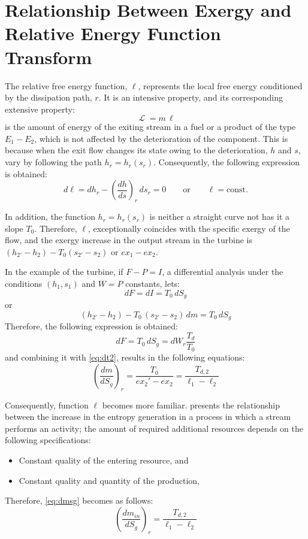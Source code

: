 \documentclass[energies,article,submit,moreauthors,pdftex]{Definitions/mdpi}
\DeclareMathOperator{\Lgdr}{\mathcal{L}}
\begin{document}
\section{Relationship Between Exergy and Relative Energy Function Transform} 
The relative free energy function, $\ell$, represents the local free energy conditioned by the dissipation path, $r$. It is an intensive property, and its corresponding extensive property: 
\begin{equation}
\Lgdr = m\,\ell
\end{equation}                                                
is the amount of energy of the exiting stream in a fuel or a product of the type $E_1-E_2$, which is not affected by the deterioration of the component. This is because when the exit flow changes its state owing to the deterioration, $h$ and $s$, vary by following the path $h_r = h_r (s_r)$. Consequently, the following expression is obtained:
\begin{equation}
d\ell = dh_r - \left(\frac{dh}{ds}\right)_r\, ds_r = 0 \qquad  \text{or} \qquad \ell = \text{const}.
\end{equation}

In addition, the function $h_r = h_r(s_r)$ is neither a straight curve not has it a slope $T_0$. Therefore, $\ell$, exceptionally coincides with the specific exergy of the flow, and the exergy increase in the output stream in the turbine is $(h_{2'} - h_2) - T_0 (s_{2'} - s_2)$ or $ex_1-ex_2$. 

In the example of the turbine, if $F-P=I$, a differential analysis under the conditions $(h_1,s_1)$ and $W=P$ constants, lets:
\begin{equation}
dF=dI=T_0\,dS_g
\end{equation}
or
\begin{equation}
(h_{2'}-h_2)-T_0\,(s_{2'}-s_2)\,dm=T_0\,dS_g
\end{equation}
Therefore, the following expression is obtained:
\begin{equation}
dF=T_0\,dS_g=dW_r \frac{T_d}{T_0}
\end{equation}
and combining it with \cref{eq:dt2}, results in the following equations:
\begin{equation}
\left(\frac{dm}{dS_g}\right)_r = \frac{T_0}{ex_2'-ex_2}=\frac{T_{d,2}}{\ell_1-\ell_2}
\label{eq:dmsg}
\end{equation}

Consequently, function $\ell$ becomes more familiar.  presents the relationship between the increase in the entropy generation in a process in which a stream performs an activity; the amount of required additional resources depends on the following specifications: 
\begin{itemize}
	\item Constant quality of the entering resource, and
	\item Constant quality and quantity of the production,
\end{itemize}
Therefore, \cref{eq:dmsg} becomes as follows:
\begin{equation}
\left(\frac{dm_{in}}{dS_g}\right)_r = \frac{T_{d,2}}{\ell_1-\ell_2}
\end{equation}
\end{document}
